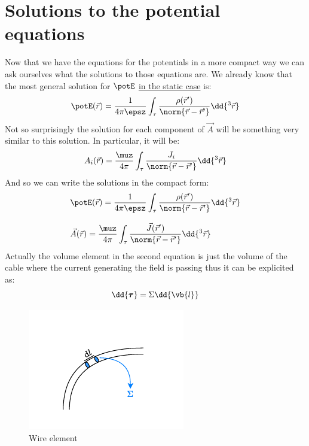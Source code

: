 \section{Solutions to the potential equations}
Now that we have the equations for the potentials in a more compact way we can ask ourselves what the solutions to those equations are. We already know that the most general solution for $\potE$ \underline{in the static case} is:
\begin{equation}
  \potE(\vec{r}) = \dfrac{1}{4 \pi \epsz}\int_{\tau} \dfrac{\rho (\vec{r}')}{\norm{\vec{r}-\vec{r}'}}\dd{^3 \vec{r}}
\end{equation}
Not so surprisingly the solution for each component of $\vec{A}$ will be something very similar to this solution. In particular, it will be:
\begin{equation}
  A_i(\vec{r}) = \dfrac{\muz}{4 \pi }\int_{\tau} \dfrac{J_i}{\norm{\vec{r}-\vec{r}'}}\dd{^3 \vec{r}}
\end{equation}
And so we can write the solutions in the compact form:
\begin{equation} \label{e:pot_general_solutions}
  \begin{split}
    &\potE(\vec{r}) = \dfrac{1}{4 \pi \epsz}\int_{\tau} \dfrac{\rho (\vec{r}')}{\norm{\vec{r}-\vec{r}'}}\dd{^3 \vec{r}} \\[8pt]
    &\vec{A}(\vec{r}) = \dfrac{\muz}{4 \pi }\int_{\tau} \dfrac{\vec{J} (\vec{r}')}{\norm{\vec{r}-\vec{r}'}}\dd{^3 \vec{r}}
  \end{split}
\end{equation}
Actually the volume element in the second equation is just the volume of the cable where the current generating the field is passing thus it can be explicited as:
\begin{equation}
  \dd{\boldsymbol{\tau}} = \Sigma \dd{\vb{l}}
\end{equation}
\begin{figure}[H]
  \centering
  \includegraphics[width=0.5\linewidth]{res/svg/cable.drawio}
  \caption{Wire element}
\end{figure}
